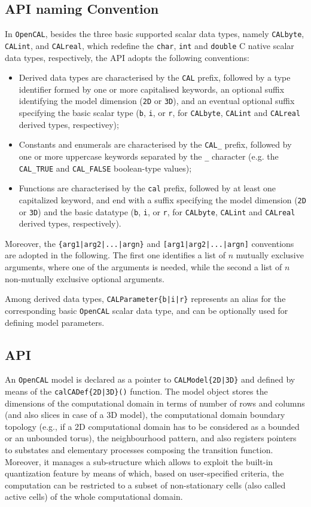 \subsection{API naming Convention}
In \texttt{OpenCAL}, besides the three basic supported scalar data types,
namely \verb'CALbyte', \verb'CALint', and \verb'CALreal', which
redefine the \verb'char', \verb'int' and \verb'double' C native
scalar data types, respectively, the API adopts the following
conventions:
\begin{itemize}
	\item Derived data types are characterised by the \verb'CAL' prefix,
	followed by a type identifier formed by one or more capitalised
	keywords, an optional suffix identifying the model dimension
	(\verb'2D' or \verb'3D'), and an eventual optional suffix
	specifying the basic scalar type (\verb'b', \verb'i', or \verb'r',
	for \verb'CALbyte', \verb'CALint' and \verb'CALreal' derived
	types, respectivey);
	\item Constants and enumerals are characterised by the \verb'CAL_'
	prefix, followed by one or more uppercase keywords separated by
	the \verb'_' character (e.g. the \verb'CAL_TRUE' and
	\verb'CAL_FALSE' boolean-type values);
	\item Functions are characterised by the \verb'cal' prefix, followed
	by at least one capitalized keyword, and end with a suffix
	specifying the model dimension (\verb'2D' or \verb'3D') and the
	basic datatype (\verb'b', \verb'i', or \verb'r', for
	\verb'CALbyte', \verb'CALint' and \verb'CALreal' derived types,
	respectively).
\end{itemize}
Moreover, the \verb'{arg1|arg2|...|argn}' and
\verb'[arg1|arg2|...|argn]' conventions are adopted in the
following. The first one identifies a list of $n$ mutually exclusive
arguments, where one of the arguments is needed, while the second a
list of $n$ non-mutually exclusive optional arguments.

Among derived data types, \verb'CALParameter{b|i|r}' represents an
alias for the corresponding basic \texttt{OpenCAL} scalar data type, and can
be optionally used for defining model parameters.


\subsection{API}
An \texttt{OpenCAL} model is declared as a pointer to \verb'CALModel{2D|3D}'
and defined by means of the \verb'calCADef{2D|3D}()' function. The
model object stores the dimensions of the computational domain in
terms of number of rows and columns (and also slices in case of a 3D
model), the computational domain boundary topology (e.g., if a 2D
computational domain has to be considered as a bounded or an
unbounded torus), the neighbourhood pattern, and also registers
pointers to substates and elementary processes composing the
transition function. Moreover, it manages a sub-structure which
allows to exploit the built-in quantization feature by means of
which, based on user-specified criteria, the computation can be
restricted to a subset of non-stationary cells (also called active
cells) of the whole computational domain.

